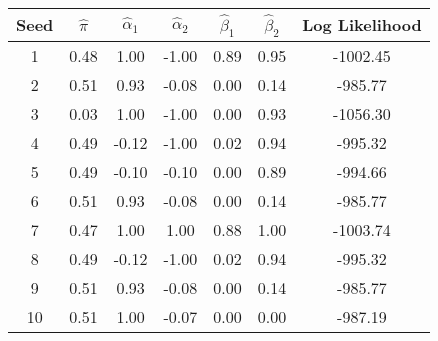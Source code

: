 \begin{tabular}{c |c |c |c |c |c |c}
Seed & $\hat\pi$ & $\hat\alpha_1$ & $\hat\alpha_2$ & $\hat\beta_1$ & $\hat\beta_2$ & Log Likelihood \\
    \hline
  1 & 0.48 & 1.00 & -1.00 & 0.89 & 0.95 & -1002.45 \\
  2 & 0.51 & 0.93 & -0.08 & 0.00 & 0.14 & -985.77 \\
  3 & 0.03 & 1.00 & -1.00 & 0.00 & 0.93 & -1056.30 \\
  4 & 0.49 & -0.12 & -1.00 & 0.02 & 0.94 & -995.32 \\
  5 & 0.49 & -0.10 & -0.10 & 0.00 & 0.89 & -994.66 \\
  6 & 0.51 & 0.93 & -0.08 & 0.00 & 0.14 & -985.77 \\
  7 & 0.47 & 1.00 & 1.00 & 0.88 & 1.00 & -1003.74 \\
  8 & 0.49 & -0.12 & -1.00 & 0.02 & 0.94 & -995.32 \\
  9 & 0.51 & 0.93 & -0.08 & 0.00 & 0.14 & -985.77 \\
  10 & 0.51 & 1.00 & -0.07 & 0.00 & 0.00 & -987.19 \\
\end{tabular}

